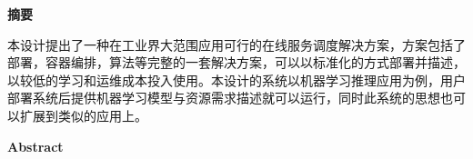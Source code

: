 \begin{center}
    \bfseries {} 摘要
\end{center}

本设计提出了一种在工业界大范围应用可行的在线服务调度解决方案，方案包括了部署，容器编排，算法等完整的一套解决方案，可以以标准化的方式部署并描述，以较低的学习和运维成本投入使用。本设计的系统以机器学习推理应用为例，用户部署系统后提供机器学习模型与资源需求描述就可以运行，同时此系统的思想也可以扩展到类似的应用上。

\begin{center}
    \bfseries {} Abstract
\end{center}

